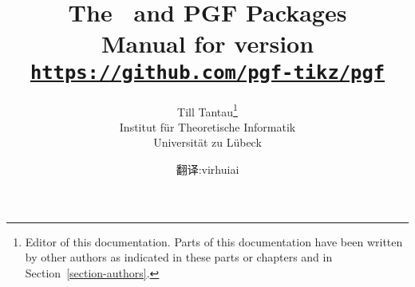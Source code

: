 \title{\bfseries The \tikzname\ and {\Large PGF} Packages\\
  \large Manual for version \pgfversion\\[1mm]
\large\href{https://github.com/pgf-tikz/pgf}{\texttt{https://github.com/pgf-tikz/pgf}}}
\author{Till Tantau\footnote{Editor of this documentation. Parts of
    this documentation have been written by other authors as indicated
    in these parts or chapters and in Section~\ref{section-authors}.}\\
  \normalsize Institut für Theoretische Informatik\\[-1mm]
  \normalsize Universität zu Lübeck\and 翻译:virhuiai}

\maketitle